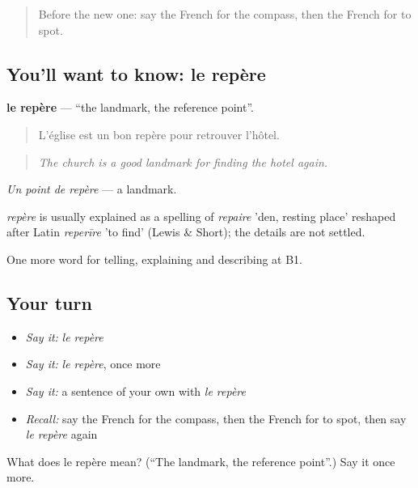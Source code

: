 \label{lesson:FR-C434-repere}



\begin{quote}
Before the new one: say the French for the compass, then the French for to spot.
\end{quote}

\subsection*{You'll want to know: le repère}
\textbf{le repère} — \textquotedblleft{}the landmark, the reference point\textquotedblright{}.

\begin{quote}
L'église est un bon repère pour retrouver l'hôtel.
\end{quote}

\begin{quote}
\emph{The church is a good landmark for finding the hotel again.}
\end{quote}

\emph{Un point de repère} — a landmark.

\begin{cousinweb}
\emph{repère} is usually explained as a spelling of \emph{repaire} 'den, resting place' reshaped after Latin \emph{reperīre} 'to find' (Lewis \& Short); the details are not settled.
\end{cousinweb}

\begin{grammarlens}[title={What you've built}]
One more word for telling, explaining and describing at B1.
\end{grammarlens}

\subsection*{Your turn}
\begin{itemize}
\raggedright
  \item \emph{Say it:} \emph{le repère}
  \item \emph{Say it:} \emph{le repère}, once more
  \item \emph{Say it:} a sentence of your own with \emph{le repère}
  \item \emph{Recall:} say the French for the compass, then the French for to spot, then say \emph{le repère} again
\end{itemize}

\begin{tcolorbox}[breakable,colback=teal!4,colframe=teal!35!black,title={Before you move on}]
What does le repère mean? (\textquotedblleft{}The landmark, the reference point\textquotedblright{}.) Say it once more.
\end{tcolorbox}
